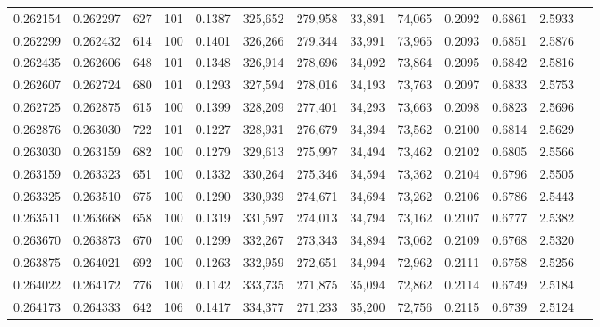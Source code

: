 \begin{tabular}{rrrrrrrrrrrrr}
0.262154 & 0.262297 &   627 & 101 &                                     0.1387 & 325,652 & 279,958 &  33,891 &  74,065 & 0.2092 & 0.6861 & 2.5933 \\
0.262299 & 0.262432 &   614 & 100 &                                     0.1401 & 326,266 & 279,344 &  33,991 &  73,965 & 0.2093 & 0.6851 & 2.5876 \\
0.262435 & 0.262606 &   648 & 101 &                                     0.1348 & 326,914 & 278,696 &  34,092 &  73,864 & 0.2095 & 0.6842 & 2.5816 \\
0.262607 & 0.262724 &   680 & 101 &                                     0.1293 & 327,594 & 278,016 &  34,193 &  73,763 & 0.2097 & 0.6833 & 2.5753 \\
0.262725 & 0.262875 &   615 & 100 &                                     0.1399 & 328,209 & 277,401 &  34,293 &  73,663 & 0.2098 & 0.6823 & 2.5696 \\
0.262876 & 0.263030 &   722 & 101 &                                     0.1227 & 328,931 & 276,679 &  34,394 &  73,562 & 0.2100 & 0.6814 & 2.5629 \\
0.263030 & 0.263159 &   682 & 100 &                                     0.1279 & 329,613 & 275,997 &  34,494 &  73,462 & 0.2102 & 0.6805 & 2.5566 \\
0.263159 & 0.263323 &   651 & 100 &                                     0.1332 & 330,264 & 275,346 &  34,594 &  73,362 & 0.2104 & 0.6796 & 2.5505 \\
0.263325 & 0.263510 &   675 & 100 &                                     0.1290 & 330,939 & 274,671 &  34,694 &  73,262 & 0.2106 & 0.6786 & 2.5443 \\
0.263511 & 0.263668 &   658 & 100 &                                     0.1319 & 331,597 & 274,013 &  34,794 &  73,162 & 0.2107 & 0.6777 & 2.5382 \\
0.263670 & 0.263873 &   670 & 100 &                                     0.1299 & 332,267 & 273,343 &  34,894 &  73,062 & 0.2109 & 0.6768 & 2.5320 \\
0.263875 & 0.264021 &   692 & 100 &                                     0.1263 & 332,959 & 272,651 &  34,994 &  72,962 & 0.2111 & 0.6758 & 2.5256 \\
0.264022 & 0.264172 &   776 & 100 &                                     0.1142 & 333,735 & 271,875 &  35,094 &  72,862 & 0.2114 & 0.6749 & 2.5184 \\
0.264173 & 0.264333 &   642 & 106 &                                     0.1417 & 334,377 & 271,233 &  35,200 &  72,756 & 0.2115 & 0.6739 & 2.5124 \\

\end{tabular}
